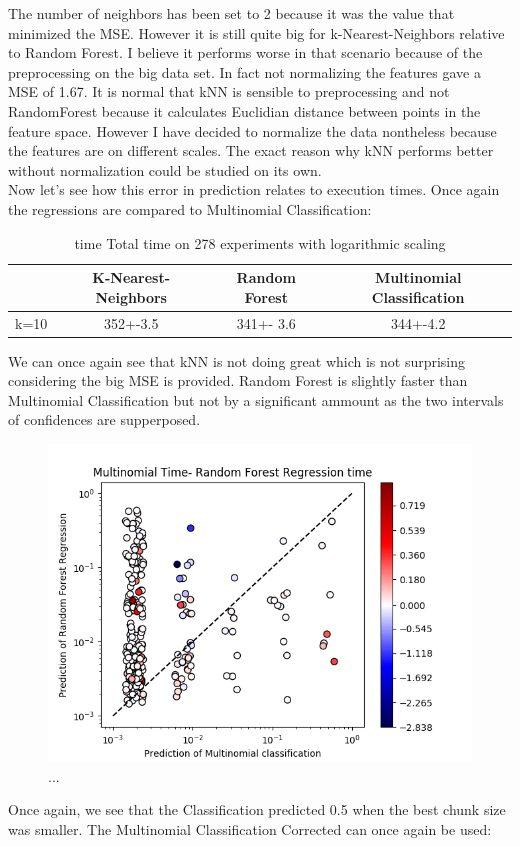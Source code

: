 \documentclass[12pt]{article}
\begin{document}
The number of neighbors has been set to 2 because it was the value that minimized the MSE. However it is still quite big for k-Nearest-Neighbors relative to Random Forest. I believe it performs worse in that scenario because of the preprocessing on the big data set. In fact not normalizing the features gave a MSE of 1.67. It is normal that kNN is sensible to preprocessing and not RandomForest because it calculates Euclidian distance between points in the feature space. However I have decided to normalize the data nontheless because the features are on different scales. The exact reason why kNN performs better without normalization could be studied on its own.
\\

Now let's see how this error in prediction relates to execution times. Once again the regressions are compared to Multinomial Classification:

\begin{table}[h]
	\centering
	\caption{ time Total time on 278 experiments with logarithmic scaling}
	\label{my-label}
	\begin{tabular}{|c|c|c|c|}
		\hline
		& K-Nearest-Neighbors & Random Forest &Multinomial Classification\\ \hline
		k=10  & 352+-3.5        & 341+- 3.6&344+-4.2 \\ \hline
	\end{tabular}
\end{table}

We can once again see that kNN is not doing great which is not surprising considering the big MSE is provided. Random Forest is slightly faster than Multinomial Classification but not by a significant ammount as the two intervals of confidences are supperposed.

\begin{figure}[H]
	\centering
	\includegraphics[width=150mm]{time_bigdata_rfr_vs_multinomial.png}
	\caption{...}
\end{figure}
Once again, we see that the Classification predicted 0.5 when the best chunk size was smaller. The Multinomial Classification Corrected can once again be used:
\end{document}
